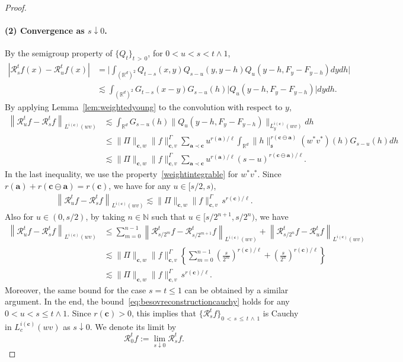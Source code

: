 \documentclass[10pt]{amsart}
\theoremstyle{definition}
\numberwithin{equation}{section}
\newcommand{\bbR}{\mathbb{R}}
\newcommand{\bbN}{\mathbb{N}}
\newcommand{\mfs}{\mathfrak{s}}
\newcommand{\wco}{w^*}
\newcommand{\vco}{v^*}
\newcommand{\bfa}{\mathbf{a}}
\newcommand{\bfc}{\mathbf{c}}
\newcommand{\bfcoa}{\mathbf{c}\ominus\mathbf{a}}
\newcommand{\mcR}{\mathcal{R}}
\begin{document}
\begin{proof}
\paragraph*{(2) Convergence as $s\downarrow0$.}
By the semigroup property of $\{Q_t\}_{t\,>\,0}$, for $0<u<s<t\wedge1$,
\begin{align*}
\left|\mcR_s^tf(x)-\mcR_u^tf(x)\right| &=\bigg|\int_{(\bbR^d)^2}Q_{t-s}(x,y)Q_{s-u}(y,y-h)Q_u(y-h,F_y-F_{y-h})dydh\bigg|\\
&\lesssim\int_{(\bbR^d)^2}G_{t-s}(x-y)G_{s-u}(h)\big|Q_u(y-h,F_y-F_{y-h})\big|dydh.
\end{align*}
By applying Lemma~\ref{lem:weightedyoung} to the convolution with respect to $y$,
\begin{align*}
\left\|\mcR_u^tf-\mcR_s^tf\right\|_{L^{i(\bfc)}(wv)} &\lesssim\int_{\bbR^d}G_{s-u}(h)\big\|Q_u(y-h,F_{y}-F_{y-h})\big\|_{L_y^{i(\bfc)}(wv)}dh\\
&\le\|\Pi\|_{\bfc,w}\|f\|_{\bfc,v}^\Gamma\sum_{\bfa\prec\bfc}u^{r(\bfa)/\ell}\int_{\bbR^d}\|h\|_{\mfs}^{r(\bfcoa)}(\wco\vco)(h)G_{s-u}(h)dh\\
&\lesssim
\|\Pi\|_{\bfc,w}\|f\|_{\bfc,v}^\Gamma\sum_{\bfa\prec\bfc}u^{r(\bfa)/\ell}(s-u)^{r(\bfcoa)/\ell}.
\end{align*}
In the last inequality, we use the property~\eqref{weightintegrable} for $\wco\vco$. Since $r(\bfa)+r(\bfcoa)=r(\bfc)$, we have for any $u\in[s/2,s)$,
\begin{align}\label{eq:besovreconstructioncauchy}
\left\|\mcR_u^tf-\mcR_s^tf\right\|_{L^{i(\bfc)}(wv)}\lesssim\|\Pi\|_{\bfc,w}\|f\|_{\bfc,v}^\Gamma\, s^{r(\bfc)/\ell}.
\end{align}
Also for $u\in(0,s/2)$, by taking $n\in\bbN$ such that $u\in[s/2^{n+1},s/2^n)$, we have
\begin{align*}
\left\|\mcR_u^tf-\mcR_s^tf\right\|_{L^{i(\bfc)}(wv)} &\le\sum_{m=0}^{n-1}\left\|\mcR_{s/2^m}^tf-\mcR_{s/2^{m+1}}^tf\right\|_{L^{i(\bfc)}(wv)}+\left\|\mcR_{s/2^n}^tf-\mcR_u^tf\right\|_{L^{i(\bfc)}(wv)}\\
&\lesssim\|\Pi\|_{\bfc,w}\|f\|_{\bfc,v}^\Gamma\left
\{\sum_{m=0}^{n-1}\left(\frac{s}{2^m}\right)^{r(\bfc)/\ell}+\left(\frac{s}{2^n}\right)^{r(\bfc)/\ell}\right\}\\
&\lesssim\|\Pi\|_{\bfc,w}\|f\|_{\bfc,v}^\Gamma\, s^{r(\bfc)/\ell}.
\end{align*}
Moreover, the same bound for the case $s=t\le1$ can be obtained by a similar argument. In the end, the bound~\eqref{eq:besovreconstructioncauchy} holds for any $0<u<s\le t\wedge1$. Since $r(\bfc)>0$, this implies that $\{\mcR_s^tf\}_{0\,<\,s\,\le\,t\,\wedge\,1}$ is Cauchy in $L_c^{i(\bfc)}(wv)$ as $s\downarrow0$. We denote its limit by
\[
\mcR_0^tf:=\lim_{s\downarrow0}\mcR_s^tf.
\]


\end{proof}
\end{document}
